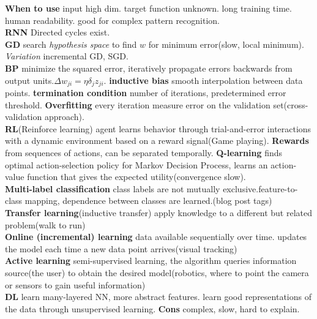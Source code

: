 \documentclass[cheatsheet.tex]{subfiles}
\begin{document}
\textbf{When to use} input high dim. target function unknown. long training time. human readability. good for complex pattern recognition.\\

\textbf{RNN} Directed cycles exist.\\

\textbf{GD} search \textit{hypothesis space} to find $w$ for minimum error(slow, local minimum). \textit{Variation} incremental GD, SGD.\\

\textbf{BP} minimize the squared error, iteratively propagate errors backwards from output units.$\Delta w_{ji}=\eta \delta_jz_{ji}$. \textbf{inductive bias}  smooth interpolation between data points. \textbf{termination condition} number of iterations, predetermined error threshold. \textbf{Overfitting} every iteration measure error on the validation set(cross-validation approach).\\

\textbf{RL}(Reinforce learning) agent learns behavior through trial-and-error interactions with a dynamic environment based on a reward signal(Game playing). \textbf{Rewards} from sequences of actions, can be separated temporally. \textbf{Q-learning} finds optimal action-selection policy for Markov Decision Process, learns an action-value function that gives the expected utility(convergence slow).\\

\textbf{Multi-label classification} class labels are not mutually exclusive.feature-to-class mapping, dependence between classes are learned.(blog post tags)\\

\textbf{Transfer learning}(inductive transfer) apply knowledge to a different but related problem(walk to run)\\

\textbf{Online (incremental) learning} data available sequentially over time. updates the model each time a new data point arrives(visual tracking)\\

\textbf{Active learning} semi-supervised learning, the algorithm queries information source(the user) to obtain the desired model(robotics, where to point the camera or sensors to gain useful information)\\

\textbf{DL} learn many-layered NN, more abstract features. learn good representations of the data through unsupervised learning. \textbf{Cons} complex, slow, hard to explain.
\end{document}
